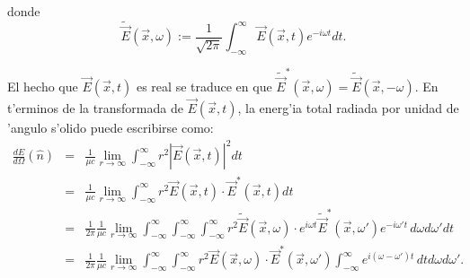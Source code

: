 donde
\begin{equation}
\tilde{\vec{E}}(\vec{x},\omega) :=\frac{1}{\sqrt{2\pi}}\int_{-\infty}^{\infty}\vec{E}(\vec{x},t) e^{-i\omega t}dt .  \label{dp3}
\end{equation}

El hecho que %
$ \vec{E}(\vec{x},t)$ es real se traduce en que 
$\tilde{\vec{E}}^*(\vec{x},\omega)=\tilde{\vec{E}}(\vec{x},-\omega)$. En t'erminos de la transformada de 
$ \vec{E}(\vec{x},t)$, la energ'ia total radiada por unidad de 'angulo s'olido puede escribirse como:
\begin{eqnarray}
\frac{dE}{d\Omega}(\hat{n}) &=&\frac{1}{\mu c}\lim_{r\to\infty} \int_{-\infty}^{\infty}r^2\left|\vec{E}(\vec{x},t)
\right|^2dt \label{dEdO0}\\
&=&\frac{1}{\mu c}\lim_{r\to\infty}\int_{-\infty}^{\infty}r^2\vec{E}(\vec{x},t)\cdot \vec{E}^*(\vec{x},t)dt\\
&=&\frac{1}{2\pi}\frac{1}{\mu c}\lim_{r\to\infty}\int_{-\infty}^{\infty}\int_{-\infty}^{\infty}\int_{-\infty}^{
\infty}r^2\tilde{\vec{E}}(\vec{x},\omega) \cdot e^{i\omega t}\tilde{\vec{E}}^\ast(\vec{x},\omega')e^{-i\omega' t}\,d\omega d\omega' dt\\
&=&\frac{1}{2\pi}\frac{1}{\mu c}\lim_{r\to\infty} \int_{-\infty}^{\infty}\int_{-\infty}^{\infty}r^2\vec{E}(\vec{x},\omega)\cdot \vec{E}^*(\vec{x},\omega')\int_{-\infty}^{\infty} e^{i(\omega-\omega')t}\,dtd\omega d\omega' .
\end{eqnarray}
